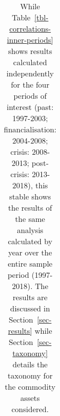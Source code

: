 \documentclass[
  authoryear,
  preprint,
  3p]{elsarticle}
\begin{document}
\endgroup{}

\newpage

\begin{landscape}\begingroup\fontsize{7}{9}\selectfont

\begin{longtable}[t]{>{}l>{}l>{}l>{}l>{}r>{}r>{}r>{}r>{}r>{}r>{}r>{}r>{}r>{}r}

\caption{\label{tbl-correlations-inner-years}While
Table~\ref{tbl-correlations-inner-periods} shows results calculated
independently for the four periods of interest (past: 1997-2003;
financialisation: 2004-2008; crisis: 2008-2013; post-crisis: 2013-2018),
this stable shows the results of the same analysis calculated by year
over the entire sample period (1997-2018). The results are discussed in
Section~\ref{sec-results} while Section~\ref{sec-taxonomy} details the
taxonomy for the commodity assets considered.}

\tabularnewline


\end{longtable}
\end{landscape}
\end{document}
